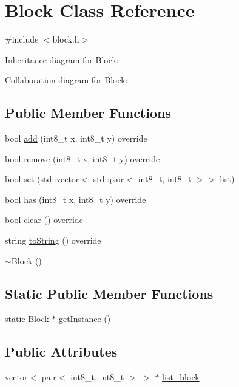 \hypertarget{class_block}{\section{Block Class Reference}
\label{class_block}
}


{\ttfamily \#include $<$block.\-h$>$}



Inheritance diagram for Block\-:


Collaboration diagram for Block\-:
\subsection*{Public Member Functions}
\begin{DoxyCompactItemize}
\item 
bool \hyperlink{class_block_aed3bcda97836cd92c2856e5c5e06e883}{add} (int8\-\_\-t x, int8\-\_\-t y) override
\item 
bool \hyperlink{class_block_a51b901e4a8b6ad9b7dca8a7a0dee5180}{remove} (int8\-\_\-t x, int8\-\_\-t y) override
\item 
bool \hyperlink{class_block_a0876bcd3bdb4e627de3e78faa31163c5}{set} (std\-::vector$<$ std\-::pair$<$ int8\-\_\-t, int8\-\_\-t $>$$>$ list)
\item 
bool \hyperlink{class_block_a3932c46f03bf956c2ae094b96eab67d3}{has} (int8\-\_\-t x, int8\-\_\-t y) override
\item 
bool \hyperlink{class_block_a37bf8cd7e85de983bc56eb19b168575a}{clear} () override
\item 
string \hyperlink{class_block_a012fdf4452ee116b61948e7cdf0475ca}{to\-String} () override
\item 
\hyperlink{class_block_a19d1bd0e1cef6a865ed2745a2e648405}{$\sim$\-Block} ()
\end{DoxyCompactItemize}
\subsection*{Static Public Member Functions}
\begin{DoxyCompactItemize}
\item 
static \hyperlink{class_block}{Block} $\ast$ \hyperlink{class_block_a2cf0004e7ab0f92b52bca2ebf8a1d52c}{get\-Instance} ()
\end{DoxyCompactItemize}
\subsection*{Public Attributes}
\begin{DoxyCompactItemize}
\item 
vector$<$ pair$<$ int8\-\_\-t, int8\-\_\-t $>$ $>$ $\ast$ \hyperlink{class_block_a45c3e71b45b9ef6364eac9354563aedd}{list\-\_\-block}
\end{DoxyCompactItemize}


